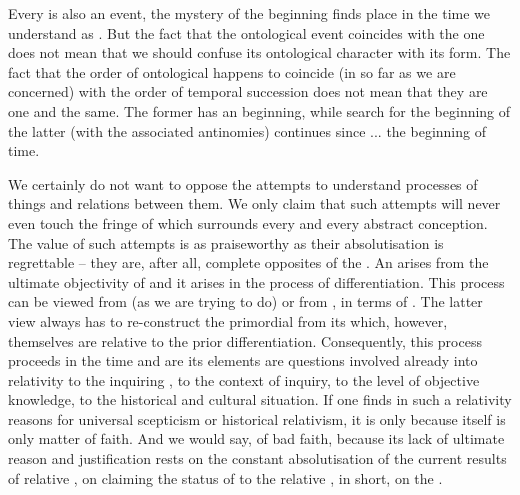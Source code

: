 Every  is also an  event, the mystery of the beginning
finds place in the time we understand as . But the fact
that the ontological event coincides with the  one does not mean that
we should confuse its ontological character with its  form.  The
fact that the order of ontological  happens to coincide (in so far
as we are concerned) with the order of temporal succession does not mean that they are one and the same. The former has an
 beginning, while search for the beginning of the latter (with the
associated antinomies) continues since ... the beginning of time.

We certainly do not want to oppose the attempts to understand 
processes of  things and relations between them. We only claim that
such attempts will never even touch the fringe of  which
surrounds every  and every abstract conception. The value
of such attempts is as praiseworthy as their absolutisation is regrettable --
they are, after all, complete opposites of the . An
 arises from the ultimate objectivity of  and it
arises in the process of differentiation. This process can be viewed from
 (as we are trying to do) or from , in terms of
. The latter view always has to
re-construct the primordial  from its  which, however, themselves
are relative to the prior differentiation. Consequently,  this process
proceeds in the  time and  are its 
elements are questions involved already into relativity to the inquiring
, to the context of inquiry, to the level of objective knowledge,
to the historical and cultural situation.
If one finds in such a relativity reasons for  universal
scepticism or historical relativism, it is only because  itself
is only matter of faith. And we would say, of bad faith, because its lack of
ultimate reason and justification rests on the constant absolutisation of the
current results of relative , on claiming the status of
 to the relative , in short, on the
.  


